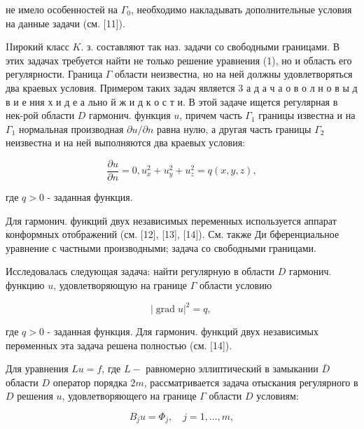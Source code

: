\documentclass[10pt]{article}
\begin{document}
не имело особенностей на $\Gamma_{0}$, необходимо накладывать дополнительные условия на данные задачи (см. [11]).



IIирокий класс $K$. з. составляют так наз. задачи со свободными границами. В этих задачах требуется найти не только решение уравнения (1), но и область его регулярности. Граница $\Gamma$ области неизвестна, но на ней должны удовлетворяться два краевых условия. Примером таких задач является 3 а д а ч а о в о л н о в ы д в и е ния х и д е а льно й ж и д к о с т и. В этой задаче ищется регулярная в нек-рой области $D$ гармонич. функция $u$, причем часть $\Gamma_{1}$ границы известна и на $\Gamma_{1}$ нормальная производная $\partial u / \partial n$ равна нулю, а другая часть границы $\Gamma_{2}$ неизвестна и на ней выполняются два краевых условия:



\[

\frac{\partial u}{\partial n}=0, u_{x}^{2}+u_{y}^{2}+u_{z}^{2}=q(x, y, z),

\]



где $q>0$ - заданная функция.



Для гармонич. функций двух независимых переменных используется аппарат конформных отображений (см. [12], [13], [14]). См. также Ди бференциальное уравнение с частными производными; задача со свободными границами.



Исследовалась следующая задача: найти регулярную в области $D$ гармонич. функцию $u$, удовлетворяющую на границе $\Gamma$ области условию



\[

|\operatorname{grad} u|^{2}=q \text {, }

\]



где $q>0$ - заданная функция. Для гармонич. функций двух независимых перөменных эта задача решена полностью (см. [14]).



Для уравнения $L u=f$, где $L-$ равномерно эллиптический в замыкании $\bar{D}$ области $D$ оператор порядка $2 m$, рассматривается задача отыскания регулярного в $D$ решения $u$, удовлетворяющего на границе $\Gamma$ области $D$ условиям:



\[

B_{j} u=\Phi_{j}, \quad j=1, \ldots, m,

\]
\end{document}
